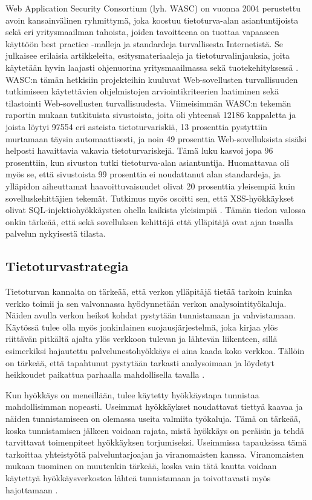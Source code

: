 Web Application Security Consortium (lyh. WASC) on vuonna 2004 perustettu avoin kansainvälinen ryhmittymä, joka koostuu tietoturva-alan asiantuntijoista sekä eri 
yritysmaailman tahoista, joiden tavoitteena on tuottaa vapaaseen käyttöön best practice -malleja ja standardeja turvallisesta Internetistä. Se julkaisee
erilaisia artikkeleita, esitysmateriaaleja ja tietoturvalinjauksia, joita käytetään hyvin laajasti ohjenuorina yritysmaailmassa sekä tuotekehityksessä \cite{WASC}.
WASC:n tämän hetkisiin projekteihin kuuluvat Web-sovellusten turvallisuuden tutkimiseen käytettävien ohjelmistojen arviointikriteerien laatiminen sekä tilastointi
Web-sovellusten turvallisuudesta. Viimeisimmän WASC:n tekemän raportin mukaan tutkituista sivustoista, joita oli yhteensä 12186 kappaletta ja joista löytyi 97554 
eri asteista tietoturvariskiä, 13 prosenttia pystyttiin murtamaan täysin automaattisesti, ja noin 49 prosenttia Web-sovelluksista sisälsi helposti havaittavia vakavia 
tietoturvariskejä. Tämä luku kasvoi jopa 96 prosenttiin, kun sivuston tutki tietoturva-alan asiantuntija. Huomattavaa oli myös se, että sivustoista 99 prosenttia
ei noudattanut alan standardeja, ja ylläpidon aiheuttamat haavoittuvaisuudet olivat 20 prosenttia yleisempiä kuin sovelluskehittäjien tekemät. Tutkimus myös 
osoitti sen, että XSS-hyökkäykset olivat SQL-injektiohyökkäysten ohella kaikista yleisimpiä \cite{WASCb}. Tämän tiedon valossa onkin tärkeää, että sekä sovelluksen
kehittäjä että ylläpitäjä ovat ajan tasalla palvelun nykyisestä tilasta. 

\subsection{Tietoturvastrategia}

Tietoturvan kannalta on tärkeää, että verkon ylläpitäjä tietää tarkoin
kuinka verkko toimii ja sen valvonnassa hyödynnetään verkon
analysointityökaluja. Näiden avulla verkon heikot kohdat pystytään
tunnistamaan ja vahvistamaan. Käytössä tulee olla myös jonkinlainen
suojausjärjestelmä, joka kirjaa ylös riittävän pitkältä ajalta ylös
verkkoon tulevan ja lähtevän liikenteen, sillä esimerkiksi hajautettu
palvelunestohyökkäys ei aina kaada koko verkkoa. Tällöin on tärkeää,
että tapahtunut pystytään tarkasti analysoimaan ja löydetyt heikkoudet
paikattua parhaalla mahdollisella tavalla \cite{DDOS}.

Kun hyökkäys on meneillään, tulee käytetty hyökkäystapa tunnistaa mahdollisimman
nopeasti. Useimmat hyökkäykset noudattavat tiettyä kaavaa ja näiden
tunnistamiseen on olemassa useita valmiita työkaluja. Tämä on tärkeää, koska
tunnistamisen jälkeen voidaan rajata, mistä hyökkäys on peräisin ja tehdä
tarvittavat toimenpiteet hyökkäyksen torjumiseksi. Useimmissa tapauksissa
tämä tarkoittaa yhteistyötä palveluntarjoajan ja viranomaisten kanssa.
Viranomaisten mukaan tuominen on muutenkin tärkeää, koska vain tätä kautta
voidaan käytettyä hyökkäysverkostoa lähteä tunnistamaan ja toivottavasti myös
hajottamaan \cite{DDOS}.


